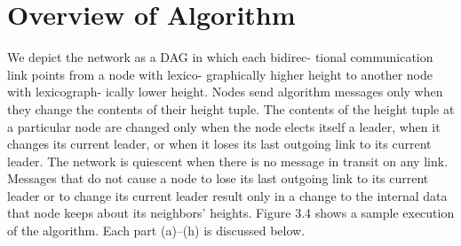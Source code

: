 \section{Overview of Algorithm}
We depict the network as a DAG in which each bidirec-
tional communication link points from a node with lexico-
graphically higher height to another node with lexicograph-
ically lower height. Nodes send algorithm messages only
when they change the contents of their height tuple. The
contents of the height tuple at a particular node are changed
only when the node elects itself a leader, when it changes its
current leader, or when it loses its last outgoing link to its
current leader. The network is quiescent when there is no
message in transit on any link. Messages that do not cause
a node to lose its last outgoing link to its current leader or
to change its current leader result only in a change to the
internal data that node keeps about its neighbors’ heights.
Figure 3.4 shows a sample execution of the algorithm.
Each part (a)–(h) is discussed below.
